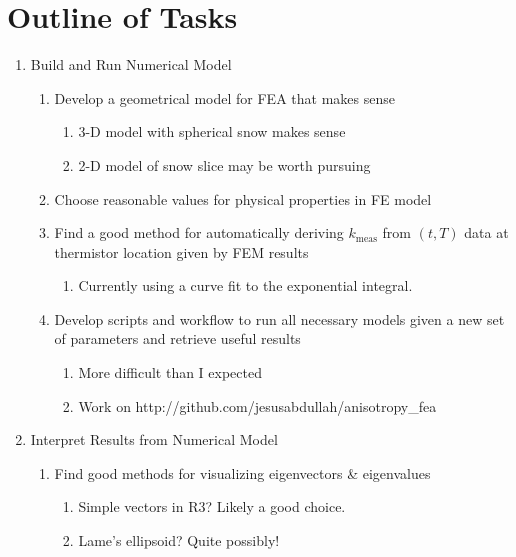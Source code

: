 \documentclass[10pt, letterpaper]{article}
\begin{document}
    \section{Outline of Tasks}
    \begin{enumerate}
        \item Build and Run Numerical Model
        \begin{enumerate}
            \item Develop a geometrical model for FEA that makes sense
            \begin{enumerate}
                \item 3-D model with spherical snow makes sense \checkmark
                \item 2-D model of snow slice may be worth pursuing
            \end{enumerate}
            \item Choose reasonable values for physical properties in FE model \checkmark
            \item Find a good method for automatically deriving \(k_\textrm{meas}\) from \((t,T)\) data at thermistor location given by FEM results \checkmark
            \begin{enumerate}
                \item Currently using a curve fit to the exponential integral.
            \end{enumerate}
            \item Develop scripts and workflow to run all necessary models given a new set of parameters and retrieve useful results \checkmark
            \begin{enumerate}
                \item More difficult than I expected
                \item Work on http://github.com/jesusabdullah/anisotropy\_fea
            \end{enumerate}
        \end{enumerate}
        \item Interpret Results from Numerical Model
        \begin{enumerate}
            \item Find good methods for visualizing eigenvectors \& eigenvalues
            \begin{enumerate}
                \item Simple vectors in R3? Likely a good choice.
                \item Lame's ellipsoid? Quite possibly!

\end{enumerate}
\end{enumerate}
\end{enumerate}
\end{document}
